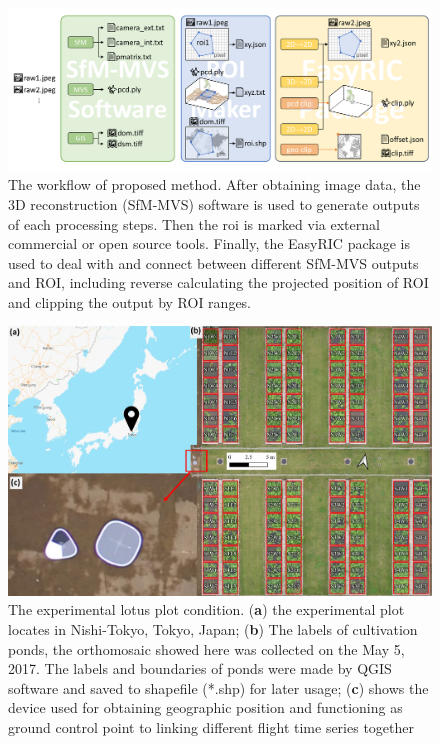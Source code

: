 \documentclass{configs/bmcart}
\begin{document}
\begin{backmatter}
\begin{figure}[!htb]
  \includegraphics[width=0.95\linewidth]{figures/workflow.pdf}
  \caption{The workflow of proposed method. After obtaining image data, the 3D reconstruction (SfM-MVS) software is used to generate outputs of each processing steps. Then the \acrfull*{roi} is marked via external commercial or open source tools. Finally, the EasyRIC package is used to deal with and connect between different SfM-MVS outputs and ROI, including reverse calculating the projected position of ROI and clipping the output by ROI ranges.}
  \label{fig:workflow}
\end{figure}

\begin{figure}[!htb]
  \includegraphics[width=0.95\linewidth]{figures/map.pdf}
  \caption{The experimental lotus plot condition. (\textbf{a}) the experimental plot locates in Nishi-Tokyo, Tokyo, Japan; (\textbf{b}) The labels of cultivation ponds, the orthomosaic showed here was collected on the May 5, 2017. The labels and boundaries of ponds were made by QGIS software and saved to shapefile (*.shp) for later usage; (\textbf{c}) shows the device used for obtaining geographic position and functioning as ground control point to linking different flight time series together}
  \label{fig:map}
\end{figure}


\end{backmatter}
\end{document}

